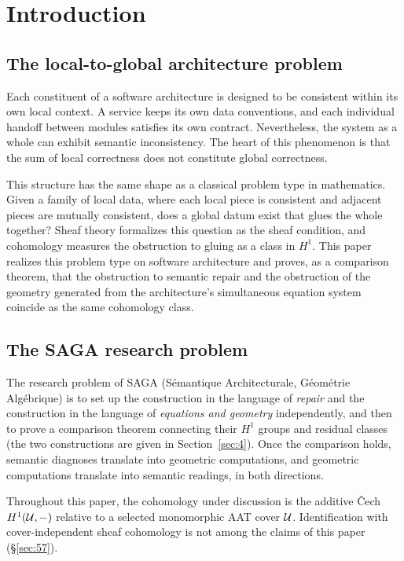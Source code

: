 \section{Introduction}\label{sec:1}

\subsection{The local-to-global architecture problem}\label{sec:11}

Each constituent of a software architecture is designed to be consistent
within its own local context. A service keeps its own data conventions, and
each individual handoff between modules satisfies its own contract.
Nevertheless, the system as a whole can exhibit semantic inconsistency. The
heart of this phenomenon is that the sum of local correctness does not
constitute global correctness.

This structure has the same shape as a classical problem type in
mathematics. Given a family of local data, where each local piece is
consistent and adjacent pieces are mutually consistent, does a global datum exist
that glues the whole together? Sheaf theory formalizes this question as the
sheaf condition, and cohomology measures the obstruction to gluing as a
class in $H^1$. This paper realizes this problem type on software
architecture and proves, as a comparison theorem, that the obstruction to
semantic repair and the obstruction of the geometry generated from the
architecture's simultaneous equation system coincide as the same
cohomology class.

\subsection{The SAGA research problem}\label{sec:12}

The research problem of SAGA (S\'emantique Architecturale, G\'eom\'etrie
Alg\'ebrique) is to set up the construction in the language of
\emph{repair} and the construction in the language of \emph{equations and
geometry} independently, and then to prove a comparison theorem connecting
their $H^1$ groups and residual classes (the two constructions are given in
Section~\ref{sec:4}). Once the comparison holds, semantic diagnoses
translate into geometric computations, and geometric computations translate
into semantic readings, in both directions.

Throughout this paper, the cohomology under discussion is the additive
\v{C}ech $H^1(\mathcal{U},-)$ relative to a selected monomorphic AAT cover $\mathcal{U}$.
Identification with cover-independent sheaf cohomology is not among the
claims of this paper (\S\ref{sec:57}).


